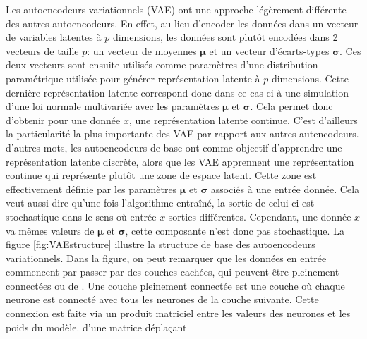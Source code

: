 Les autoencodeurs variationnels (VAE)  \cite{kingma2013autoencoding} ont une approche légèrement différente des autres autoencodeurs. En effet, au lieu d'encoder les données dans un vecteur de variables latentes à $p$ dimensions, les données sont plutôt encodées dans 2 vecteurs de taille $p$: un vecteur de moyennes $\boldsymbol \mu$ et un vecteur d'écarts-types $\boldsymbol \sigma$. Ces deux vecteurs sont ensuite utilisés comme paramètres d'une distribution paramétrique utilisée pour générer \DIFdelbegin {}\DIFdelend \DIFaddbegin {}\DIFaddend représentation latente à $p$ dimensions. Cette dernière représentation latente correspond donc dans ce cas-ci à une simulation d'une loi normale multivariée avec les paramètres $\boldsymbol \mu$ et $\boldsymbol \sigma$. Cela permet donc d'obtenir pour une donnée $x$, une représentation latente continue. C'est d'ailleurs la particularité la plus importante des VAE par rapport aux autres autencodeurs. \DIFdelbegin {}\DIFdelend \DIFaddbegin {}\DIFaddend d'autres mots, les autoencodeurs de base ont comme objectif d'apprendre une représentation latente discrète, alors que les VAE apprennent une représentation continue qui représente plutôt une zone de \DIFdelbegin {}\DIFdelend \DIFaddbegin {}\DIFaddend espace latent. Cette zone est effectivement définie par les paramètres $\boldsymbol \mu$ et $\boldsymbol \sigma$ associés à une entrée donnée. Cela veut aussi dire qu'une fois l'algorithme entraîné, la sortie de celui-ci est stochastique dans le sens où \DIFdelbegin {}\DIFdelend \DIFaddbegin {}\DIFaddend entrée $x$ \DIFdelbegin {}\DIFdelend \DIFaddbegin {}\DIFaddend sorties différentes. Cependant, une donnée $x$ va \DIFdelbegin {}\DIFdelend \DIFaddbegin {}\DIFaddend mêmes valeurs de $\boldsymbol \mu$ et $\boldsymbol \sigma$, cette composante n'est donc pas stochastique. La figure \ref{fig:VAEstructure} illustre la structure de base des autoencodeurs variationnels. Dans la figure, on peut remarquer que les données en entrée commencent par passer par des couches cachées, qui peuvent être pleinement connectées ou de \DIFdelbegin {}\DIFdelend \DIFaddbegin {}\DIFaddend . Une couche pleinement connectée est une couche où chaque neurone est connecté avec tous les neurones de la couche suivante. Cette connexion est faite via un produit matriciel entre les valeurs des neurones et les poids du modèle. \DIFdelbegin {}\DIFdelend \DIFaddbegin {}\DIFaddend d'une matrice \DIFdelbegin {}\DIFdelend \DIFaddbegin {}\DIFaddend déplaçant \DIFdelbegin {}\textit{}%

